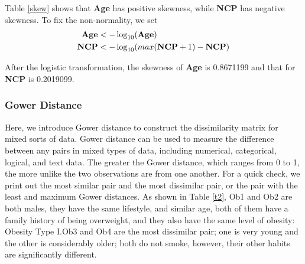 Table \ref{skew} shows that \textbf{Age} has positive skewness, while \textbf{NCP} has negative skewness. To fix the non-normality, we set 
\begin{align}
    \textbf{Age} &<- \log_{10}(\textbf{Age})\notag \\ 
    \textbf{NCP} &<-\log_{10}(max(\textbf{NCP}+1)-\textbf{NCP})\notag
\end{align}

After the logistic transformation, the skewness of \textbf{Age} is 0.8671199 and that for \textbf{NCP} is 0.2019099.

\subsubsection{Gower Distance}\label{dis_sec}

Here, we introduce Gower distance\cite{gower1971general} to construct the dissimilarity matrix for mixed sorts of data. Gower distance can be used to measure the difference between any pairs in mixed types of data, including numerical, categorical, logical, and text data. The greater the Gower distance, which ranges from 0 to 1, the more unlike the two observations are from one another. For a quick check, we print out the most similar pair and the most dissimilar pair, or the pair with the least and maximum Gower distances. As shown in Table \ref{t2}, Ob1 and Ob2 are both males, they have the same lifestyle, and similar age, both of them have a family history of being overweight, and they also have the same level of obesity: Obesity Type I.Ob3 and Ob4 are the most dissimilar pair; one is very young and the other is considerably older; both do not smoke, however, their other habits are significantly different.
